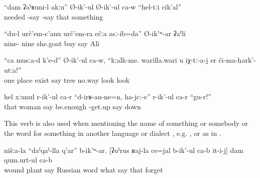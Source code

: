 \begin{exe}
	\ex	\label{ex:He says, I do not need these things}
	\gll	``dam	ʡaˁʁuni-l	akːu''	Ø-ik'-ul	Ø-ik'-ul ca-w	``hel-tːi	cik'al''\\
			needed		-say	-say 	that	something\\
	\glt	{}

	\ex	\label{ex:‎‎‎I bought 99 goats, said Ali}
	\gll	``du-l	urč'em-c'anu	urč'em-ra	ečːa	asː-ib=da''	Ø-ik'ʷ-ar	ʡaˁli	\\
			nine-	nine	she.goat	buy	say	Ali\\
	\glt	{}

	\ex	\label{ex:‎‎In once place, there are, he says, trees. Whatever may happen, do not look at these trees}
	\gll	``ca	musːa-d	k'e-d''	Ø-ik'-ul	ca-w,	``kːalk-me.	warilla.wari	u	iχ-tː-a-j	er	či-ma-hark'-utːa!''\\
		one	place	exist	say		tree	no.way			look	look\\
	\glt	{}

	\ex	\label{ex:‎‎The wife says, This is enough, get up}
	\gll	hel	xːunul	r-ik'-ul	ca-r	``d-irʁ-an-ne=n,	ha-jcː-e''	r-ik'-ul	ca-r	``gu-r!''\\
		that	woman	say		be.enough	-get.up	say		down\\
	\glt	{}
\end{exe}

This verb is also used when mentioning the name of something or somebody or the word for something in another language or dialect , e.g.  , or as in .
%
\begin{exe}
	\ex	\label{ex:‎‎In our (language) it is called plant of the wound I forgot what it is called in Russian}
	\gll	nišːa-la	``daˁqaˁ-lla	q'ar''	b-ik'ʷ-ar.	[ʡuˁrus	ʁaj-la	ce=jal	b-ik'-ul	ca-b	it-i-j] dam	qum.urt-ul	ca-b\\
			wound	plant	say	Russian word	what	say		that		forget	\\
	\glt	{}
\end{exe}

